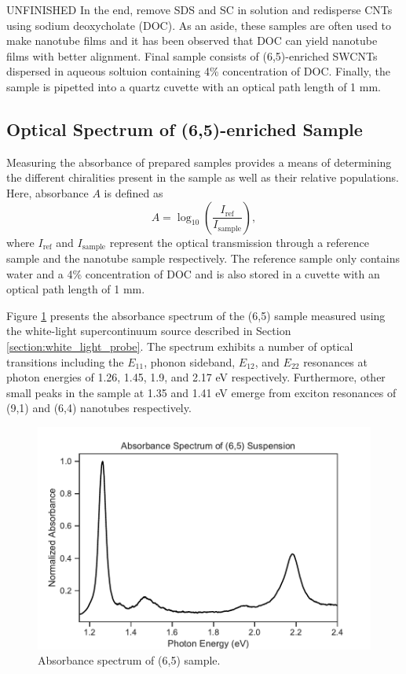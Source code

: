 {\color{red} UNFINISHED} In the end, remove SDS and SC in solution and redisperse CNTs using sodium deoxycholate (DOC). As an aside, these samples are often used to make nanotube films and it has been observed that DOC can yield nanotube films with better alignment. Final sample consists of (6,5)-enriched SWCNTs dispersed in aqueous soltuion containing 4\% concentration of DOC. Finally, the sample is pipetted into a quartz cuvette with an optical path length of 1 mm. 

\subsection{Optical Spectrum of (6,5)-enriched Sample}

Measuring the absorbance of prepared samples provides a means of determining the different chiralities present in the sample as well as their relative populations. Here, absorbance $A$ is defined as 
\begin{equation}
A = \log_{10}\left(\dfrac{I_{\mathrm{ref}}}{I_{\mathrm{sample}}}\right),
\end{equation}
where $I_{\mathrm{ref}}$ and $I_{\mathrm{sample}}$ represent the optical transmission through a reference sample and the nanotube sample respectively. The reference sample only contains water and a 4\% concentration of DOC and is also stored in a cuvette with an optical path length of 1 mm. 

Figure \ref{fig:sample_absorbance} presents the absorbance spectrum of the (6,5) sample measured using the white-light supercontinuum source described in Section \ref{section:white_light_probe}. The spectrum exhibits a number of optical transitions including the $E_{11}$, phonon sideband, $E_{12}$, and $E_{22}$ resonances at photon energies of 1.26, 1.45, 1.9, and 2.17 eV respectively. Furthermore, other small peaks in the sample at 1.35 and 1.41 eV emerge from exciton resonances of (9,1) and (6,4) nanotubes respectively.

\begin{figure}[H]
	\centering
	\includegraphics[scale=0.7]{images/chapter_methods/sample_absorbance}
	\caption{ Absorbance spectrum of (6,5) sample.}
	\label{fig:sample_absorbance}
\end{figure}

